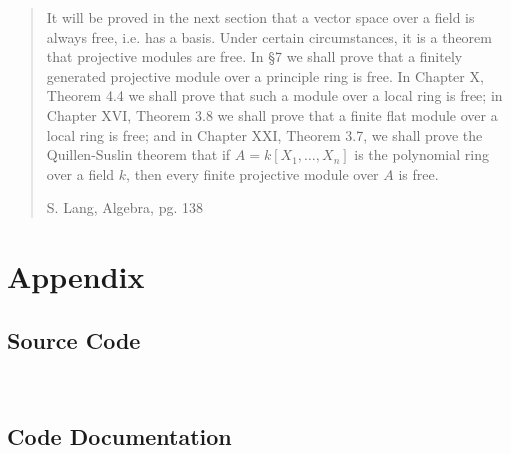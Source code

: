 \documentclass{amsart}
\theoremstyle{definition}
\theoremstyle{remark}
\numberwithin{equation}{section}
\begin{document}
\blockquote[S. Lang, Algebra, pg. 138]{It will be proved in the next section that a vector space over a field is always free, i.e. has a basis. Under certain circumstances, it is a theorem that projective modules are free. In \S 7 we shall prove that a finitely generated projective module over a principle ring is free. In Chapter X, Theorem 4.4 we shall prove that such a module over a local ring is free; in Chapter XVI, Theorem 3.8 we shall prove that a finite flat module over a local ring is free; and in Chapter XXI, Theorem 3.7, we shall prove the Quillen-Suslin theorem that if $A = k[X_1, \ldots, X_n]$ is the polynomial ring over a field $k$, then every finite projective module over $A$ is free.}

\newpage

\section*{Appendix}

\subsection*{Source Code}

\leavevmode \\


\subsection*{Code Documentation}

\leavevmode \\


\newpage

\printbibliography
\end{document}
